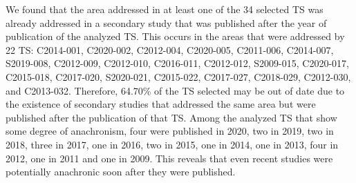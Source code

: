 \documentclass[sigconf]{acmart}
\begin{document}
We found that the area addressed in at least one of the 34 selected TS was already addressed in a secondary study that was published after the year of publication of the analyzed TS. This occurs in the areas that were addressed by 22 TS: C2014-001, C2020-002, C2012-004, C2020-005, C2011-006, C2014-007, S2019-008, C2012-009, C2012-010, C2016-011, C2012-012, S2009-015, C2020-017, C2015-018, C2017-020, S2020-021, C2015-022, C2017-027, C2018-029, C2012-030, and C2013-032. Therefore, 64.70\% of the TS selected may be out of date due to the existence of secondary studies that addressed the same area but were published after the publication of that TS. Among the analyzed TS that show some degree of anachronism, four were published in 2020, two in 2019, two in 2018, three in 2017, one in 2016, two in 2015, one in 2014, one in 2013, four in 2012, one in 2011 and one in 2009. This reveals that even recent studies were potentially anachronic soon after they were published. 








\end{document}
